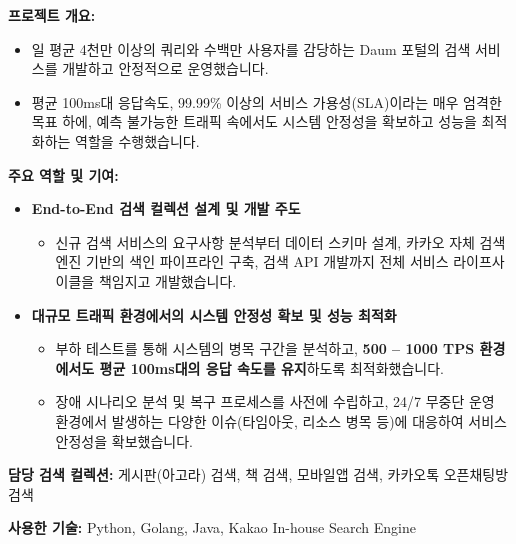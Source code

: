 \documentclass[letterpaper,11pt]{article}
\begin{document}
    {
      \textbf{프로젝트 개요:}
      \begin{itemize}[leftmargin=*]
          \item 일 평균 4천만 이상의 쿼리와 수백만 사용자를 감당하는 Daum 포털의 검색 서비스를 개발하고 안정적으로 운영했습니다.
          \item 평균 100ms대 응답속도, 99.99\% 이상의 서비스 가용성(SLA)이라는 매우 엄격한 목표 하에, 예측 불가능한 트래픽 속에서도 시스템 안정성을 확보하고 성능을 최적화하는 역할을 수행했습니다.
      \end{itemize}

      \textbf{주요 역할 및 기여:}
      \begin{itemize}[leftmargin=*]
          \item \textbf{End-to-End 검색 컬렉션 설계 및 개발 주도}
            \begin{itemize}[leftmargin=*, label=$\circ$]
              \item 신규 검색 서비스의 요구사항 분석부터 데이터 스키마 설계, 카카오 자체 검색엔진 기반의 색인 파이프라인 구축, 검색 API 개발까지 전체 서비스 라이프사이클을 책임지고 개발했습니다.
            \end{itemize}

          \item \textbf{대규모 트래픽 환경에서의 시스템 안정성 확보 및 성능 최적화}
            \begin{itemize}[leftmargin=*, label=$\circ$]
              \item 부하 테스트를 통해 시스템의 병목 구간을 분석하고, \textbf{500 -- 1000 TPS 환경에서도 평균 100ms대의 응답 속도를 유지}하도록 최적화했습니다.
              \item 장애 시나리오 분석 및 복구 프로세스를 사전에 수립하고, 24/7 무중단 운영 환경에서 발생하는 다양한 이슈(타임아웃, 리소스 병목 등)에 대응하여 서비스 안정성을 확보했습니다.
            \end{itemize}
      \end{itemize}

      \textbf{담당 검색 컬렉션:} 게시판(아고라) 검색, 책 검색, 모바일앱 검색, 카카오톡 오픈채팅방 검색

      \textbf{사용한 기술:} Python, Golang, Java, Kakao In-house Search Engine
    }
    
  \resumeProjectListEnd
  
\end{document}
